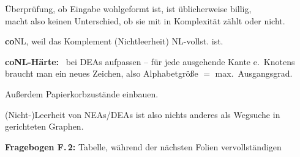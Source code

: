 \begin{frame}
{        \par\smallskip
        Überprüfung, ob Eingabe wohlgeformt ist, ist üblicherweise billig, \\
        macht also keinen Unterschied, ob sie mit in Komplexität zählt oder nicht.
        
        \par\bigskip
        \textbf{co}NL, weil das Komplement (Nichtleerheit) NL-vollst. ist.
        
        \par\bigskip
        {\textgray
          \textbf{coNL-Härte:}~  bei DEAs aufpassen -- für jede ausgehende Kante e.\ Knotens braucht man ein neues Zeichen,
          also Alphabetgröße $=$ max.\ Ausgangsgrad.%

          \par\smallskip
          Außerdem Papierkorbzustände einbauen.
        }
        
        
        \par\bigskip
        (Nicht-)Leerheit von NEAs/DEAs ist also nichts anderes als Wegsuche in gerichteten Graphen.
        
        \par\medskip
        {\textgray\textbf{Fragebogen F.\,2:} Tabelle, während der nächsten Folien vervollständigen}
        
        \par
      }
    \end{frame}

